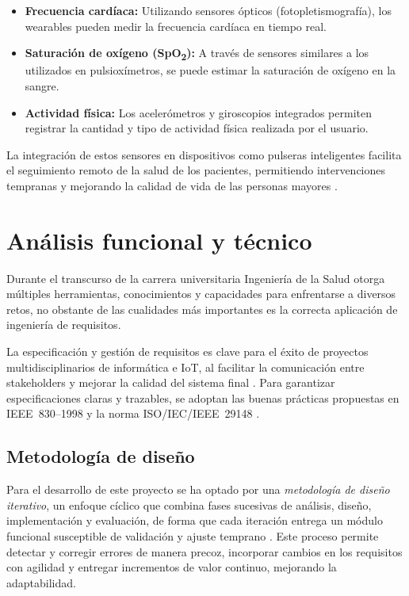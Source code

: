 \documentclass[12pt, a4paper]{article}
\begin{document}
	\begin{itemize}
		\item \textbf{Frecuencia cardíaca:} Utilizando sensores ópticos (fotopletismografía), los wearables pueden medir la frecuencia cardíaca en tiempo real.
		\item \textbf{Saturación de oxígeno (SpO\textsubscript{2}):} A través de sensores similares a los utilizados en pulsioxímetros, se puede estimar la saturación de oxígeno en la sangre.
		\item \textbf{Actividad física:} Los acelerómetros y giroscopios integrados permiten registrar la cantidad y tipo de actividad física realizada por el usuario.
	\end{itemize}
	
	La integración de estos sensores en dispositivos como pulseras inteligentes facilita el seguimiento remoto de la salud de los pacientes, permitiendo intervenciones tempranas y mejorando la calidad de vida de las personas mayores \cite{rodriguez2015}.


\section{Análisis funcional y técnico}
	
	Durante el transcurso de la carrera universitaria Ingeniería de la Salud otorga múltiples herramientas, conocimientos y capacidades para enfrentarse a diversos retos, no obstante de las cualidades más importantes es la correcta aplicación de ingeniería de requisitos.

	La especificación y gestión de requisitos es clave para el éxito de proyectos multidisciplinarios de informática e IoT, al facilitar la comunicación entre stakeholders y mejorar la calidad del sistema final \cite{wiegers, pohl}. Para garantizar especificaciones claras y trazables, se adoptan las buenas prácticas propuestas en IEEE 830–1998 y la norma ISO/IEC/IEEE 29148 \cite{ieee830, iso29148}.
	
		\subsection{Metodología de diseño}
		Para el desarrollo de este proyecto se ha optado por una \emph{metodología de diseño iterativo}, un enfoque cíclico que combina fases sucesivas de análisis, diseño, implementación y evaluación, de forma que cada iteración entrega un módulo funcional susceptible de validación y ajuste temprano \cite{wiegers,iso29148}. Este proceso permite detectar y corregir errores de manera precoz, incorporar cambios en los requisitos con agilidad y entregar incrementos de valor continuo, mejorando la adaptabilidad.
		
\end{document}

